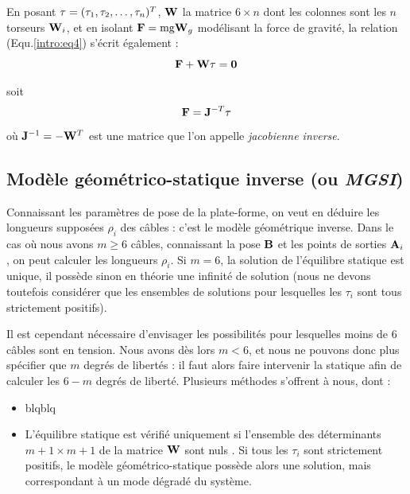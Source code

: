 En posant ${\bf \tau} = (\tau_1, \tau_2, \dots, \tau_n)^T$, ${\bf W}$ la matrice 
$6 \times n$ dont les colonnes sont les $n$ torseurs ${\bf W}_i$, et en isolant 
$\mathcal {\bf F} =  \hbox{mg} {\bf W}_g$ modélisant la force de gravité, la 
relation (Equ.\ref{intro:eq4}) s'écrit également :
\begin{equation}
\mathcal {\bf F} + {\bf W} \tau = {\bf 0}
\label{intro:eq5a}
\end{equation}

soit  
\begin{equation}
\mathcal {\bf F} = {\bf J}^{-T} {\bf \tau}
\label{intro:eq5b}
\end{equation}
où ${\bf J}^{-1} = - {\bf W}^T$ est une matrice que l'on appelle {\it jacobienne 
inverse}.

\subsection{Modèle géométrico-statique inverse (ou {\it MGSI})} 
\label{chap0-1-3}


Connaissant les paramètres de pose de la plate-forme, on veut en déduire les 
longueurs supposées $\rho_i$ des câbles : c'est le modèle géométrique inverse. 
Dans le cas où nous avons $m \geq 6$ câbles, connaissant la pose 
${\bf B}$ et les points de sorties ${\bf A}_i$, on peut calculer les longueurs 
$\rho_i$. Si $m = 6$, la solution de l'équilibre statique est unique, 
il possède sinon en théorie une infinité de solution (nous ne devons toutefois 
consid\'erer que les ensembles de solutions pour lesquelles les $\tau_i$ sont 
tous strictement positifs).

Il est cependant n\'ecessaire d'envisager les possibilit\'es pour lesquelles 
moins de $6$ c\^ables sont en tension. Nous avons d\`es lors $m < 6$, et nous 
ne pouvons donc plus sp\'ecifier que $m$ degr\'es de libert\'es : il faut alors 
faire intervenir la statique afin de calculer les $6-m$ degr\'es de libert\'e. 
Plusieurs m\'ethodes s'offrent \`a nous, dont :
\begin{itemize}
 \item blqblq
\item L'équilibre statique est vérifié 
uniquement si l'ensemble des déterminants $m+1 \times m+1$ de la matrice ${\bf 
W}$ sont nuls \cite{carricato_merlet2013}. Si tous les $\tau_i$ sont 
strictement positifs, le modèle géométrico-statique possède alors une solution, 
mais correspondant à un mode dégradé du système.
\end{itemize}



